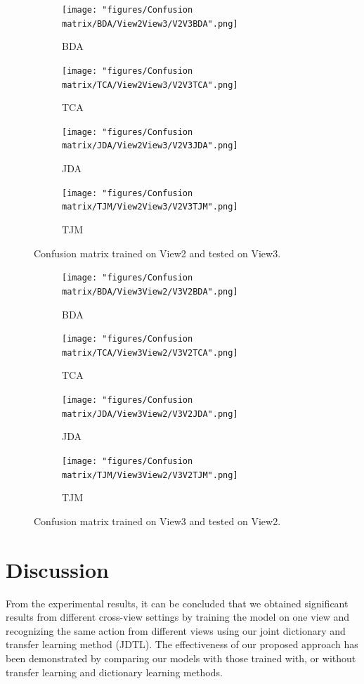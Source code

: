 \begin{figure}[hbt!]
	\begin{subfigure}{.5\textwidth}
		\centering
		\texttt{[image: "figures/Confusion matrix/BDA/View2View3/V2V3BDA".png]}
		\caption{BDA}
		\label{fig:V2V3BDA}
	\end{subfigure}%
	\begin{subfigure}{.5\textwidth}
		\centering
		\texttt{[image: "figures/Confusion matrix/TCA/View2View3/V2V3TCA".png]}
		\caption{TCA}
		\label{fig:V2V3TCA}
	\end{subfigure}
	\begin{subfigure}{.5\textwidth}
		\centering
		\texttt{[image: "figures/Confusion matrix/JDA/View2View3/V2V3JDA".png]}
		\caption{JDA}
		\label{fig:V2V3JDA}
	\end{subfigure}%
	\begin{subfigure}{.5\textwidth}
		\centering
		\texttt{[image: "figures/Confusion matrix/TJM/View2View3/V2V3TJM".png]}
		\caption{TJM}
		\label{fig:V2V3TJM}
	\end{subfigure}
	\caption{Confusion matrix trained on View2 and tested on View3.}
	\label{fig:CMV2V3}
\end{figure}



\begin{figure}[hbt!]
	\begin{subfigure}{.5\textwidth}
		\centering
		\texttt{[image: "figures/Confusion matrix/BDA/View3View2/V3V2BDA".png]}
		\caption{BDA}
		\label{fig:V3V2BDA}
	\end{subfigure}%
	\begin{subfigure}{.5\textwidth}
		\centering
		\texttt{[image: "figures/Confusion matrix/TCA/View3View2/V3V2TCA".png]}
		\caption{TCA}
		\label{fig:V3V2TCA}
	\end{subfigure}
	\begin{subfigure}{.5\textwidth}
		\centering
		\texttt{[image: "figures/Confusion matrix/JDA/View3View2/V3V2JDA".png]}
		\caption{JDA}
		\label{fig:V3V2JDA}
	\end{subfigure}%
	\begin{subfigure}{.5\textwidth}
		\centering
		\texttt{[image: "figures/Confusion matrix/TJM/View3View2/V3V2TJM".png]}
		\caption{TJM}
		\label{fig:V3V2TJM}
	\end{subfigure}
	\caption{Confusion matrix trained on View3 and tested on View2.}
	\label{fig:CMV3V2}
\end{figure}


\section{Discussion}
From the experimental results, it can be concluded that we obtained significant results from different cross-view settings by training the model on one view and recognizing the same action from different views using our joint dictionary and transfer learning method (JDTL). The effectiveness of our proposed approach has been demonstrated by comparing our models with those trained with, or without transfer learning and dictionary learning methods.

